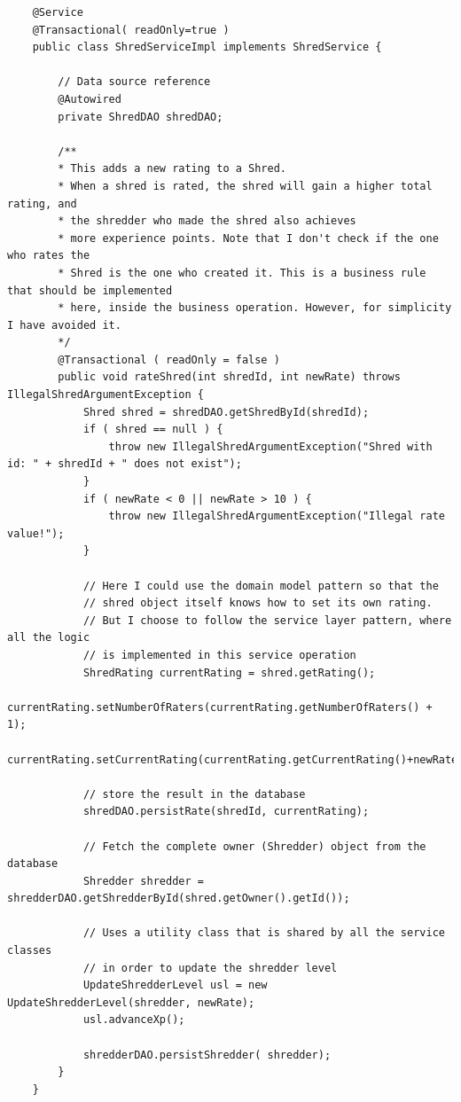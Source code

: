 	\begin{lstlisting}
	@Service
	@Transactional( readOnly=true )
	public class ShredServiceImpl implements ShredService {
	
		// Data source reference
		@Autowired
		private ShredDAO shredDAO;	
		
		/**
		* This adds a new rating to a Shred. 
		* When a shred is rated, the shred will gain a higher total rating, and
		* the shredder who made the shred also achieves
		* more experience points. Note that I don't check if the one who rates the 
		* Shred is the one who created it. This is a business rule that should be implemented
		* here, inside the business operation. However, for simplicity I have avoided it.
		*/
		@Transactional ( readOnly = false )
		public void rateShred(int shredId, int newRate) throws IllegalShredArgumentException {
			Shred shred = shredDAO.getShredById(shredId);
			if ( shred == null ) {
				throw new IllegalShredArgumentException("Shred with id: " + shredId + " does not exist");
			}
			if ( newRate < 0 || newRate > 10 ) {
				throw new IllegalShredArgumentException("Illegal rate value!");
			}
	
			// Here I could use the domain model pattern so that the
			// shred object itself knows how to set its own rating.
			// But I choose to follow the service layer pattern, where all the logic
			// is implemented in this service operation
			ShredRating currentRating = shred.getRating();
			currentRating.setNumberOfRaters(currentRating.getNumberOfRaters() + 1);
			currentRating.setCurrentRating(currentRating.getCurrentRating()+newRate);
			
			// store the result in the database
			shredDAO.persistRate(shredId, currentRating);		
			
			// Fetch the complete owner (Shredder) object from the database
			Shredder shredder = shredderDAO.getShredderById(shred.getOwner().getId());
			
			// Uses a utility class that is shared by all the service classes
			// in order to update the shredder level
			UpdateShredderLevel usl = new UpdateShredderLevel(shredder, newRate);
			usl.advanceXp();
			
			shredderDAO.persistShredder( shredder);
		}
	}
	\end{lstlisting}

